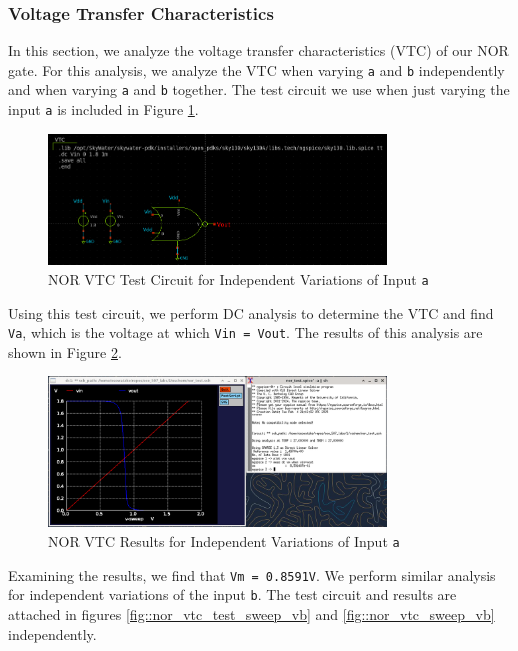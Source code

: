 \documentclass[fleqn]{article}
\begin{document}
	\subsubsection{Voltage Transfer Characteristics}
	
	In this section, we analyze the voltage transfer characteristics (VTC) of our NOR gate. For this analysis, we analyze the VTC when varying \texttt{a} and \texttt{b} independently and when varying \texttt{a} and \texttt{b} together. The test circuit we use when just varying the input \texttt{a} is included in Figure \ref{fig::nor_vtc_test_sweep_va}.
	
	\begin{figure}[H]
		\centerline{\includegraphics[width=0.8\textwidth]{nor_vtc_test_sweep_va.png}}
		\caption{NOR VTC Test Circuit for Independent Variations of Input \texttt{a}}
		\label{fig::nor_vtc_test_sweep_va}
	\end{figure}
	
	Using this test circuit, we perform DC analysis to determine the VTC and find \texttt{Va}, which is the voltage at which \texttt{Vin = Vout}. The results of this analysis are shown in Figure \ref{fig::nor_vtc_sweep_va}.
	
	\begin{figure}[H]
		\centerline{\includegraphics[width=0.8\textwidth]{nor_vtc_sweep_va.png}}
		\caption{NOR VTC Results for Independent Variations of Input \texttt{a}}
		\label{fig::nor_vtc_sweep_va}
	\end{figure}
	
	Examining the results, we find that \texttt{Vm = 0.8591V}. We perform similar analysis for independent variations of the input \texttt{b}. The test circuit and results are attached in figures \ref{fig::nor_vtc_test_sweep_vb} and \ref{fig::nor_vtc_sweep_vb} independently.
	
\end{document}
